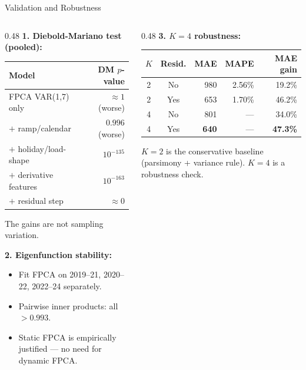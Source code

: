\documentclass[10pt,aspectratio=169]{beamer}
\begin{document}

\begin{frame}{Validation and Robustness}

  \begin{columns}
  \begin{column}{0.48\textwidth}
    \textbf{1. Diebold-Mariano test (pooled):}
    \begin{center}
    \scriptsize
    \begin{tabular}{lr}
      \toprule
      Model & DM $p$-value \\
      \midrule
      FPCA VAR(1,7) only & $\approx 1$ (worse) \\
      $+$ ramp/calendar & $0.996$ (worse) \\
      $+$ holiday/load-shape & $10^{-135}$ \\
      $+$ derivative features & $10^{-163}$ \\
      $+$ residual step & $\approx 0$ \\
      \bottomrule
    \end{tabular}
    \end{center}
    The gains are not sampling variation.

    \vspace{0.5em}
    \textbf{2. Eigenfunction stability:}
    \begin{itemize}
      \item Fit FPCA on 2019--21, 2020--22, 2022--24 separately.
      \item Pairwise inner products: all $> 0.993$.
      \item Static FPCA is empirically justified --- no need
        for dynamic FPCA.
    \end{itemize}
  \end{column}
  \begin{column}{0.48\textwidth}
    \textbf{3. $K=4$ robustness:}
    \begin{center}
    \scriptsize
    \begin{tabular}{ccrrr}
      \toprule
      $K$ & Resid. & MAE & MAPE & MAE gain \\
      \midrule
      2 & No  & 980  & 2.56\% & 19.2\% \\
      2 & Yes & 653  & 1.70\% & 46.2\% \\
      4 & No  & 801  & ---    & 34.0\% \\
      4 & Yes & \textbf{640}  & ---    & \textbf{47.3\%} \\
      \bottomrule
    \end{tabular}
    \end{center}
    $K=2$ is the conservative baseline (parsimony + variance rule).
    $K=4$ is a robustness check.


\end{column}
\end{columns}
\end{frame}
\end{document}
